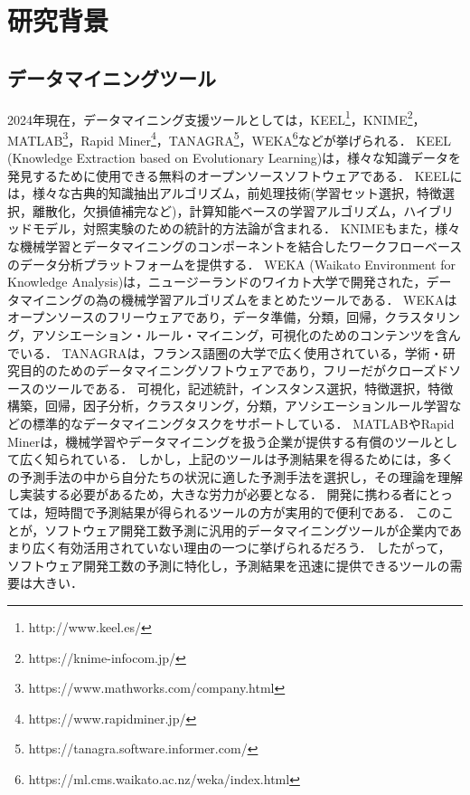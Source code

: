 \section{研究背景}\label{sec:2}


\subsection{データマイニングツール}\label{データマイニングツール}
2024年現在，データマイニング支援ツールとしては，KEEL\footnote{http://www.keel.es/}，KNIME\footnote{https://knime-infocom.jp/}，MATLAB\footnote{https://www.mathworks.com/company.html}，Rapid Miner\footnote{https://www.rapidminer.jp/}，TANAGRA\footnote{https://tanagra.software.informer.com/}，WEKA\footnote{https://ml.cms.waikato.ac.nz/weka/index.html}などが挙げられる．
KEEL (Knowledge Extraction based on Evolutionary Learning)\footnotemark[1]は，様々な知識データを発見するために使用できる無料のオープンソースソフトウェアである．
KEELには，様々な古典的知識抽出アルゴリズム，前処理技術(学習セット選択，特徴選択，離散化，欠損値補完など)，計算知能ベースの学習アルゴリズム，ハイブリッドモデル，対照実験のための統計的方法論が含まれる．
KNIME\footnotemark[2]もまた，様々な機械学習とデータマイニングのコンポーネントを結合したワークフローベースのデータ分析プラットフォームを提供する．
WEKA (Waikato Environment for Knowledge Analysis)\footnotemark[6]は，ニュージーランドのワイカト大学で開発された，データマイニングの為の機械学習アルゴリズムをまとめたツールである．
WEKAはオープンソースのフリーウェアであり，データ準備，分類，回帰，クラスタリング，アソシエーション・ルール・マイニング，可視化のためのコンテンツを含んでいる．
TANAGRA\footnotemark[5]は，フランス語圏の大学で広く使用されている，学術・研究目的のためのデータマイニングソフトウェアであり，フリーだがクローズドソースのツールである．
可視化，記述統計，インスタンス選択，特徴選択，特徴構築，回帰，因子分析，クラスタリング，分類，アソシエーションルール学習などの標準的なデータマイニングタスクをサポートしている．
MATLAB\footnotemark[3]やRapid Miner\footnotemark[4]は，機械学習やデータマイニングを扱う企業が提供する有償のツールとして広く知られている．
しかし，上記のツールは予測結果を得るためには，多くの予測手法の中から自分たちの状況に適した予測手法を選択し，その理論を理解し実装する必要があるため，大きな労力が必要となる．
開発に携わる者にとっては，短時間で予測結果が得られるツールの方が実用的で便利である．
このことが，ソフトウェア開発工数予測に汎用的データマイニングツールが企業内であまり広く有効活用されていない理由の一つに挙げられるだろう．
したがって，ソフトウェア開発工数の予測に特化し，予測結果を迅速に提供できるツールの需要は大きい．

